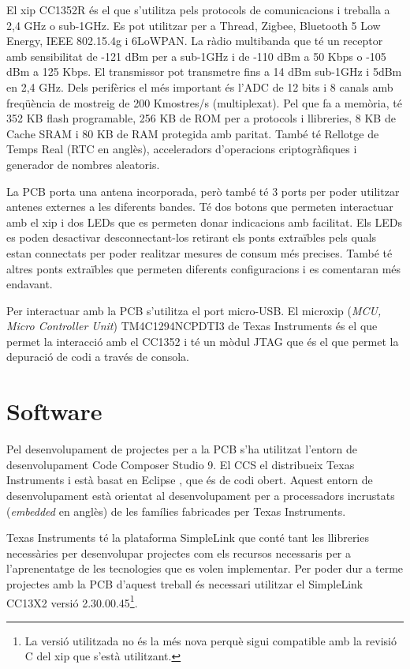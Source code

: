 El xip CC1352R és el que s'utilitza pels protocols de comunicacions i treballa a 2,4 GHz o sub-1GHz.
Es pot utilitzar per a Thread, Zigbee, Bluetooth 5 Low Energy, IEEE 802.15.4g i 6LoWPAN.
La ràdio multibanda que té un receptor amb sensibilitat de -121 dBm per a sub-1GHz i de -110 dBm a 50 Kbps o -105 dBm a 125 Kbps. El transmissor pot transmetre fins a 14 dBm sub-1GHz i 5dBm en 2,4 GHz.
Dels perifèrics el més important és l'ADC de 12 bits i 8 canals amb freqüència de mostreig de 200 Kmostres/s (multiplexat).
Pel que fa a memòria, té 352 KB flash programable, 256 KB de ROM per a protocols i llibreries, 8 KB de Cache SRAM i 80 KB de RAM protegida amb paritat.
També té Rellotge de Temps Real (RTC en anglès), acceleradors d'operacions criptogràfiques i generador de nombres aleatoris.

La PCB porta una antena incorporada, però també té 3 ports per poder utilitzar antenes externes a les diferents bandes.
Té dos botons que permeten interactuar amb el xip i dos LEDs que es permeten donar indicacions amb facilitat.
Els LEDs es poden desactivar desconnectant-los retirant els ponts extraïbles pels quals estan connectats per poder realitzar mesures de consum més precises.
També té altres ponts extraïbles que permeten diferents configuracions i es comentaran més endavant.

Per interactuar amb la PCB s'utilitza el port micro-USB.
El microxip (\textit{MCU, Micro Controller Unit}) TM4C1294NCPDTI3 de Texas Instruments és el que permet la interacció amb el CC1352 i té un mòdul JTAG que és el que permet la depuració de codi a través de consola.


\section{Software}
Pel desenvolupament de projectes per a la PCB s'ha utilitzat l'entorn de desenvolupament Code Composer Studio 9. 
El CCS el distribueix Texas Instruments i està basat en Eclipse \cite{eclipse}, que és de codi obert.
Aquest entorn de desenvolupament està orientat al desenvolupament per a processadors incrustats (\textit{embedded} en anglès) de les famílies fabricades per Texas Instruments.

Texas Instruments té la plataforma SimpleLink que conté tant les llibreries necessàries per desenvolupar projectes com els recursos necessaris per a l'aprenentatge de les tecnologies que es volen implementar.
Per poder dur a terme projectes amb la PCB d'aquest treball és necessari utilitzar el SimpleLink CC13X2 versió 2.30.00.45\footnote{La versió utilitzada no és la més nova perquè sigui compatible amb la revisió C del xip que s'està utilitzant.}.

